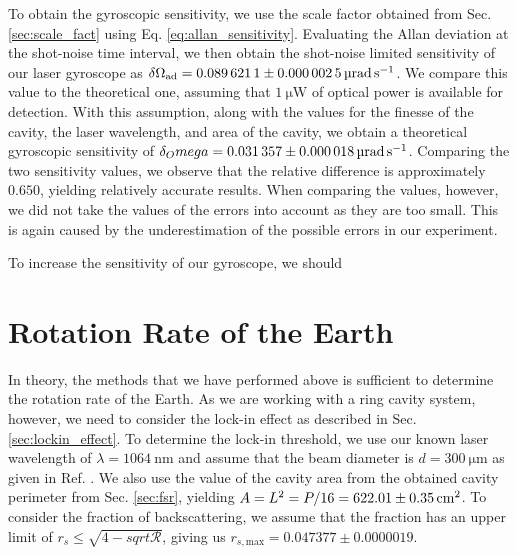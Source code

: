 \documentclass[a4paper]{report}
\numberwithin{equation}{section}
\begin{document}
To obtain the gyroscopic sensitivity, we use the scale factor obtained from Sec. \ref{sec:scale_fact} using Eq. \ref{eq:allan_sensitivity}.
Evaluating the Allan deviation at the shot-noise time interval, we then obtain the shot-noise limited sensitivity of our laser gyroscope as 
$\delta\Omega_{\mathrm{ad}} = \SI[]{0.0896211 \pm 0.0000025}[]{\micro\radian\per\second}$. We compare this value to the theoretical one,
assuming that $\SI[]{1}[]{\micro\watt}$ of optical power is available for detection. With this assumption, along with the 
values for the finesse of the cavity, the laser wavelength, and area of the cavity, we obtain a theoretical gyroscopic sensitivity
of $\delta_Omega = \SI{0.031357 \pm 0.000018}{\micro\radian\per\second}$. Comparing the two sensitivity values, we observe that the relative
difference is approximately $0.650$, yielding relatively accurate results. When comparing the values, however, we did not take the values 
of the errors into account as they are too small. This is again caused by the underestimation of the possible errors in our experiment. \par 

To increase the sensitivity of our gyroscope, we should 







\section{Rotation Rate of the Earth}

In theory, the methods that we have performed above is sufficient to determine the rotation rate of the Earth. As we are 
working with a ring cavity system, however, we need to consider the lock-in effect as described in Sec. \ref{sec:lockin_effect}. 
To determine the lock-in threshold, we use our known laser wavelength of $\lambda = \SI{1064}{\nano\metre}$ and assume that the
 beam diameter is $d = \SI{300}{\micro\metre}$ as given in Ref. \cite{Groh2021}.
We also use the value of the cavity area from the obtained cavity perimeter from Sec. \ref{sec:fsr}, yielding
$A = L^2 = P / 16 = \SI{622.01 \pm 0.35}{\centi\meter\squared}$. To consider the fraction of backscattering, we assume that the 
fraction has an upper limit of $r_s \leq \sqrt{4 - sqrt{\mathcal{R}}}$, giving us $r_{s, \mathrm{max}} = 0.047377 \pm 0.0000019$. \par 
\end{document}
